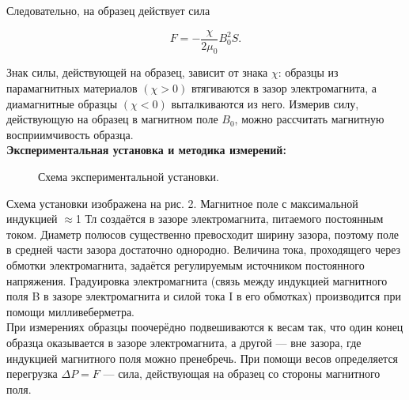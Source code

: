 \documentclass[a4paper, 12pt]{article}%
\begin{document}
	Следовательно, на образец действует сила
	
	\begin{equation}\label{4}
		F = -\frac{\chi}{2\mu_0}B^2_0S.
	\end{equation}
	
	Знак силы, действующей на образец, зависит от знака $ \chi $: образцы из парамагнитных материалов $( \chi  > 0)$ втягиваются в зазор электромагнита, а диамагнитные образцы $ (\chi < 0) $ выталкиваются из него. Измерив силу, действующую на образец в магнитном поле $ B_0 $, можно рассчитать магнитную восприимчивость образца.\\
	
	\textbf{Экспериментальная установка и методика измерений: }\\
	
		\begin{figure}[h]
		\caption{Схема экспериментальной установки.}
	\end{figure}
	
	Схема установки изображена на рис. 2. Магнитное поле с максимальной индукцией $\approx $1 Тл создаётся в зазоре электромагнита, питаемого
	постоянным током. Диаметр полюсов существенно превосходит ширину зазора, поэтому поле в средней части зазора достаточно однородно.
	Величина тока, проходящего через обмотки электромагнита, задаётся
	регулируемым источником постоянного напряжения.
	Градуировка электромагнита (связь между индукцией магнитного
	поля B в зазоре электромагнита и силой тока I в его обмотках) производится при помощи милливеберметра.\\
	
	При измерениях образцы поочерёдно подвешиваются к весам так, что один конец образца оказывается в зазоре электромагнита, а другой — вне зазора, где индукцией магнитного поля можно
	пренебречь. При помощи весов определяется перегрузка $\Delta P = F$ — сила, действующая на образец со стороны магнитного
	поля.\\
	
\end{document}
